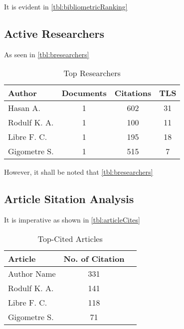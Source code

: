 \documentclass[journal, a4paper]{IEEEtran}
\begin{document}
It is evident in \autoref{tbl:bibliometricRanking} \lipsum[1]


\subsection{Active Researchers}
As seen in \autoref{tbl:bresearchers} \lipsum[1]

\begin{table}[htbp]

  \centering
  \caption{Top Researchers}
  \label{tbl:bresearchers}
  \begin{tabular}{lccc}

      \toprule
      \textbf{Author} & \textbf{Documents} & \textbf{Citations} & \textbf{TLS} \\
      \midrule
      Hasan A.                   & 1     & 602   &  31         \\
      Rodulf K. A.               & 1     & 100   &  11         \\
      Libre F. C.                & 1     & 195   &  18         \\
      Gigometre S.               & 1     & 515   &  7          \\
      \bottomrule
  \end{tabular}
\end{table}

However, it shall be noted that \autoref{tbl:bresearchers} \lipsum[1]\lipsum[1]


\subsection{Article Sitation Analysis}
It is imperative as shown in \autoref{tbl:articleCites} \lipsum[1]

\begin{table}[htbp]

  \centering
  \caption{Top-Cited Articles}
  \label{tbl:articleCites}
  \begin{tabular}{lcc}

      \toprule
      \textbf{Article} & \textbf{No. of Citation} \\
      \midrule
      Author Name       \cite{Hu2023}           &    331         \\
      Rodulf K. A.      \cite{Lingxin2022}      &    141         \\
      Libre F. C.       \cite{Entezami2020}     &    118         \\
      Gigometre S.      \cite{Lee2023}          &    71          \\
      \bottomrule
  \end{tabular}
\end{table}
\end{document}
